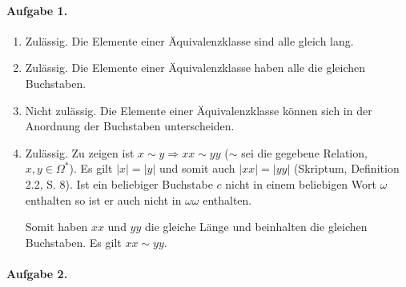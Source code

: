 \documentclass{article}
\begin{document}
\paragraph{Aufgabe 1.}

\begin{enumerate}[label=\alph*)]
    \item Zulässig. Die Elemente einer Äquivalenzklasse sind alle gleich lang.
    
    \item Zulässig. Die Elemente einer Äquivalenzklasse haben alle die gleichen Buchstaben.
    
    \item Nicht zulässig. Die Elemente einer Äquivalenzklasse können sich in der Anordnung der Buchstaben unterscheiden.
    
    \item Zulässig. Zu zeigen ist $x \sim y \Rightarrow xx \sim yy$ ($\sim$ sei die gegebene Relation, $x, y \in \Omega^*$). Es gilt $\lvert x \rvert = \lvert y \rvert$ und somit auch $\lvert xx \rvert = \lvert yy \rvert$ (Skriptum, Definition 2.2, S. 8). Ist ein beliebiger Buchstabe $c$ nicht in einem beliebigen Wort $\omega$ enthalten so ist er auch nicht in $\omega\omega$ enthalten.
    
    Somit haben $xx$ und $yy$ die gleiche Länge und beinhalten die gleichen Buchstaben. Es gilt $xx \sim yy$.
\end{enumerate}

\paragraph{Aufgabe 2.}
\end{document}
